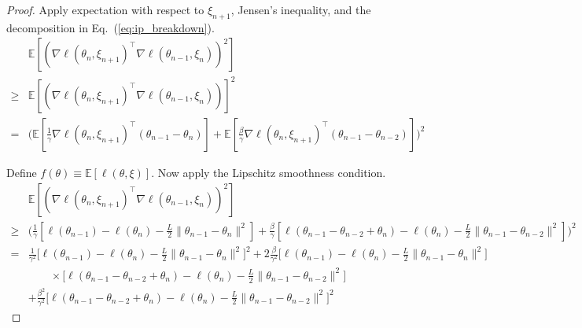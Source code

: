 \documentclass[conference]{IEEEtran}
\newcommand{\Ex}[1]{\mathbb{E}[ #1 ]}
\begin{document}
\begin{proof}
Apply expectation with respect to $\xi_{n+1}$, Jensen's inequality, and the decomposition in Eq.~(\ref{eq:ip_breakdown}).
\begin{align*}
&\Ex{ ( \nabla \ell ( \theta_n, \xi_{n+1} )^\top \nabla \ell ( \theta_{n-1}, \xi_n ) )^2 } \\
\geq& \Ex{ ( \nabla \ell ( \theta_n, \xi_{n+1} )^\top \nabla \ell ( \theta_{n-1}, \xi_n ) ) }^2 \\
=& \bigg( \Ex{ \frac{1}{\gamma} \nabla \ell ( \theta_n, \xi_{n+1} )^\top ( \theta_{n-1} - \theta_n ) }
+ \Ex{ \frac{\beta}{\gamma}  \nabla \ell ( \theta_n, \xi_{n+1} )^\top ( \theta_{n-1} - \theta_{n-2} ) } \bigg)^2
\end{align*}

Define $f(\theta) \equiv \Ex{ \ell (\theta, \xi) }$. Now apply the Lipschitz smoothness condition. 
\begin{align*}
&\Ex{ ( \nabla \ell ( \theta_n, \xi_{n+1} )^\top \nabla \ell ( \theta_{n-1}, \xi_n ) )^2 } \\
\geq& \biggl( \frac{1}{\gamma} [ \ell ( \theta_{n-1} ) - \ell ( \theta_n ) - \frac{L}{2} \| \theta_{n-1} - \theta_n \|^2 ]  + \frac{\beta}{\gamma} [ \ell ( \theta_{n-1} - \theta_{n-2} + \theta_n ) - \ell ( \theta_n ) - \frac{L}{2} \| \theta_{n-1} - \theta_{n-2} \|^2 ] \biggr)^2 \\
=& \frac{1}{\gamma^2} \bigg[ \ell ( \theta_{n-1} ) - \ell ( \theta_n ) - \frac{L}{2} \| \theta_{n-1} - \theta_n \|^2 \bigg]^2
 + 2 \frac{\beta}{\gamma^2} \bigg[ \ell ( \theta_{n-1} ) - \ell ( \theta_n ) - \frac{L}{2} \| \theta_{n-1} - \theta_n \|^2 \bigg] \\
&\quad \quad \times\bigg[ \ell ( \theta_{n-1} - \theta_{n-2} + \theta_n ) - \ell ( \theta_{n} ) - \frac{L}{2} \| \theta_{n-1} - \theta_{n-2} \|^2 \bigg] \\
&+ \frac{\beta^2}{\gamma^2} \bigg[ \ell ( \theta_{n-1} - \theta_{n-2} + \theta_n ) - \ell ( \theta_{n} ) - \frac{L}{2} \| \theta_{n-1} - \theta_{n-2} \|^2 \bigg]^2
\end{align*}


\end{proof}
\end{document}
